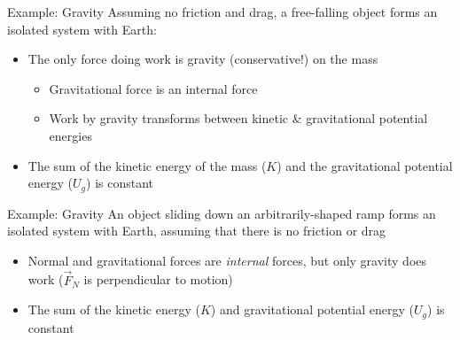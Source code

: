 \documentclass[12pt,compress,aspectratio=169]{beamer}
\begin{document}
\begin{frame}{Example: Gravity}
  Assuming no friction and drag, a free-falling object forms an isolated system
  with Earth:
  \begin{center}
  \end{center}
  \begin{itemize}
  \item The only force doing work is gravity (conservative!) on the mass
    \begin{itemize}
    \item Gravitational force is an internal force
    \item Work by gravity transforms between kinetic \& gravitational
      potential energies
    \end{itemize}
  \item The sum of the kinetic energy of the mass ($K$) and the gravitational
    potential energy ($U_g$) is constant
    
  \end{itemize}
\end{frame}


\begin{frame}{Example: Gravity}
  An object sliding down an arbitrarily-shaped ramp forms an isolated system
  with Earth, assuming that there is no friction or drag
  \begin{center}
  \end{center}
  \begin{itemize}
  \item\vspace{-.1in}Normal and gravitational forces are \emph{internal}
    forces, but only gravity does work ($\vec F_N$ is perpendicular to motion)
  \item The sum of the kinetic energy ($K$) and gravitational potential energy
    ($U_g$) is constant
    
  \end{itemize}
\end{frame}
\end{document}
